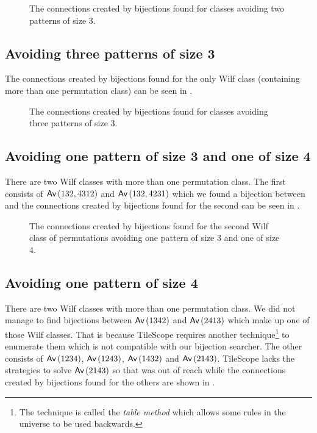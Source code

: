 \begin{figure}[ht!]
    \centering
    
    \caption{The connections created by bijections found for classes avoiding two patterns of size $3$.}
    \label{fig:2x3bi}
\end{figure}

\subsection{Avoiding three patterns of size 3}
The connections created by bijections found for the only Wilf class (containing more than one permutation class) can be seen in . 
\begin{figure}[ht!]
    \centering
    
    \caption{The connections created by bijections found for classes avoiding three patterns of size $3$.}
    \label{fig:3x3bi}
\end{figure}


\subsection{Avoiding one pattern of size 3 and one of size 4}
There are two Wilf classes with more than one permutation class. The first consists of $\textsf{Av}\left(132,4312\right)$ and $\textsf{Av}\left(132,4231\right)$ which we found a bijection between and the connections created by bijections found for the second can be seen in .

%    

\begin{figure}[ht!]
    \centering
    
    \caption{The connections created by bijections found for the second Wilf class of permutations avoiding one pattern of size 3 and one of size 4.}
    \label{fig:1x31x4bi_2}
\end{figure}

\subsection{Avoiding one pattern of size 4}
There are two Wilf classes with more than one permutation class. We did not manage to find bijections between $\textsf{Av}\left(1342\right)$ and $\textsf{Av}\left(2413\right)$ which make up one of those Wilf classes. That is because TileScope requires another technique\footnote{The technique is called the \emph{table method} which allows some rules in the universe to be used backwards.} to enumerate them which is not compatible with our bijection searcher. The other consists of $\textsf{Av}\left(1234\right)$, $\textsf{Av}\left(1243\right)$, $\textsf{Av}\left(1432\right)$ and $\textsf{Av}\left(2143\right)$. TileScope lacks the strategies to solve $\textsf{Av}\left(2143\right)$ so that was out of reach while the connections created by bijections found for the others are shown in .

